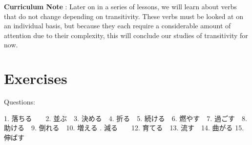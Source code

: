 \par{\textbf{Curriculum Note }: Later on in a series of lessons, we will learn about verbs that do not change depending on transitivity. These verbs must be looked at on an individual basis, but because they each require a considerable amount of attention due to their complexity, this will conclude our studies of transitivity for now. }
      
\section{Exercises}
 
\par{Questions: }

\par{1. 落ちる　　2. 並ぶ　3. 決める　4. 折る　5. 続ける　6. 燃やす　7. 過ごす　8. 助ける　9. 倒れる　10. 増える \hfill{}. 減る　　12. 育てる　13. 流す　14. 曲がる 15. 伸ばす }
    